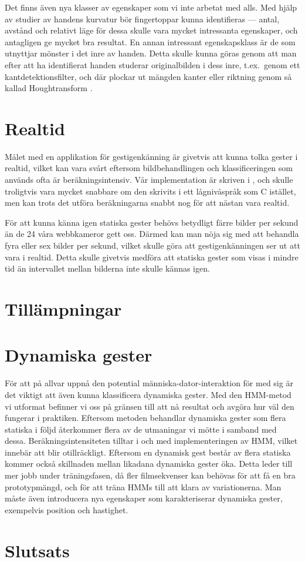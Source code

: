 \documentclass[../rapport_MVEX01-11-05]{subfiles}
\begin{document}
Det finns även nya klasser av egenskaper som vi inte arbetat med
alls. Med hjälp av studier av handens kurvatur bör fingertoppar kunna
identifieras --- antal, avstånd och relativt läge för dessa skulle vara
mycket intressanta egenskaper, och antagligen ge mycket bra resultat.
En annan intressant egenskapsklass är de som utnyttjar mönster i det
inre av handen. Detta skulle kunna göras
genom att man efter att ha identifierat handen studerar originalbilden i dess
inre, t.ex.~genom ett kantdetektionsfilter, och där plockar ut mängden
kanter eller riktning genom så kallad Houghtransform \cite[s.~23]{Rudemo09}.

\section{Realtid}
Målet med en applikation för gestigenkänning är givetvis att kunna tolka
gester i realtid, vilket kan vara svårt eftersom bildbehandlingen och
klassificeringen som används ofta är beräkningsintensiv. Vår implementation
är skriven i \MATLAB, och skulle troligtvis vara mycket snabbare om den
skrivits i ett lågnivåspråk som C istället, men kan trots det utföra
beräkningarna snabbt nog för att nästan vara realtid.

För att kunna känna igen statiska gester behövs betydligt färre bilder per
sekund än de 24 våra webbkameror gett oss. Därmed kan man nöja sig med
att behandla fyra eller sex bilder per
sekund, vilket skulle göra att gestigenkänningen ser ut att vara i realtid.
Detta skulle givetvis medföra att statiska gester som visas i mindre tid
än intervallet mellan bilderna inte skulle kännas igen.


\section{Tillämpningar}


\section{Dynamiska gester}
För att på allvar uppnå den potential människa-dator-interaktion för med sig
är det viktigt att även kunna klassificera dynamiska gester. Med den HMM-metod 
vi utformat befinner vi oss på gränsen till att nå resultat och avgöra hur väl 
den fungerar i praktiken. Eftersom metoden behandlar dynamiska gester som flera 
statiska i följd återkommer flera av de utmaningar vi mötte i samband med dessa. 
Beräkningsintensiteten tilltar i och med implementeringen av HMM, vilket innebär 
att \MATLAB blir otillräckligt. Eftersom en dynamisk gest består av flera statiska
kommer också skillnaden mellan likadana dynamiska gester öka. Detta leder till 
mer jobb under träningsfasen, då fler filmsekvenser kan behövas för att få en 
bra prototypmängd, och för att träna HMMs till att klara av variationerna. 
Man måste även introducera nya egenskaper som karakteriserar dynamiska gester, 
exempelvis position och hastighet. 




\section{Slutsats}
\end{document}
